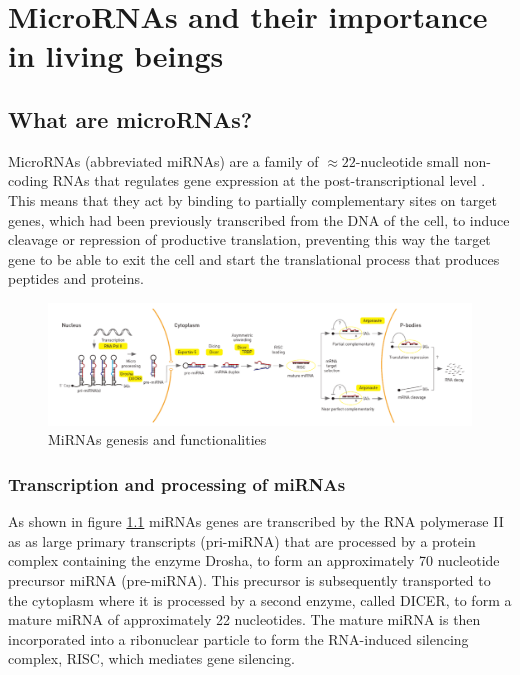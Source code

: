 
\chapter{MicroRNAs and their importance in living beings} %

\label{Chapter1} %


\newcommand{\keyword}[1]{\textbf{#1}}
\newcommand{\tabhead}[1]{\textbf{#1}}
\newcommand{\code}[1]{\texttt{#1}}
\newcommand{\file}[1]{\texttt{\bfseries#1}}
\newcommand{\option}[1]{\texttt{\itshape#1}}


\section{What are microRNAs?}
MicroRNAs (abbreviated miRNAs) are a family of $\approx 22$-nucleotide small non-coding RNAs that regulates gene expression at the post-transcriptional level \cite{mirna_intro}. This means that they act by binding to partially complementary sites on target genes, which had been previously transcribed from the DNA of the cell, to induce cleavage or repression of productive translation, preventing this way the target gene to be able to exit the cell and start the translational process that produces peptides and proteins.

\begin{figure}[hbt!]
	\centering
	\includegraphics[width=1.0\textwidth]{Figures/mirna_genesis}
	\caption{MiRNAs genesis and functionalities}
	\label{fig:mirna_genesis}
\end{figure}

\subsection{Transcription and processing of miRNAs}
As shown in figure \ref{fig:mirna_genesis} miRNAs genes are transcribed by the RNA polymerase II as as large primary transcripts (pri-miRNA) that are processed by a protein complex containing the enzyme Drosha, to form an approximately 70 nucleotide precursor miRNA (pre-miRNA). This precursor is subsequently transported to the cytoplasm where it is processed by a second enzyme, called DICER, to form a mature miRNA of approximately 22 nucleotides. The mature miRNA is then incorporated into a ribonuclear particle to form the RNA-induced silencing complex, RISC, which mediates gene silencing.

